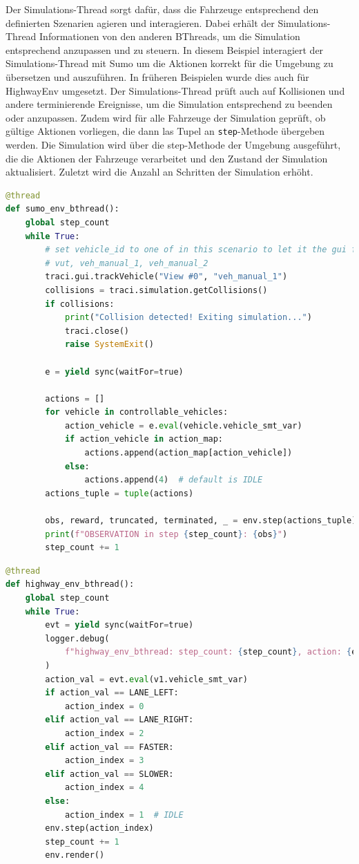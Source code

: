 Der Simulations-Thread sorgt dafür, dass die Fahrzeuge entsprechend den definierten Szenarien agieren und interagieren. Dabei erhält der Simulations-Thread Informationen von den anderen BThreads, um die Simulation entsprechend anzupassen und zu steuern.
In diesem Beispiel interagiert der Simulations-Thread mit Sumo um die Aktionen korrekt für die Umgebung zu übersetzen und auszuführen. In früheren Beispielen wurde dies auch für HighwayEnv umgesetzt.
Der Simulations-Thread prüft auch auf Kollisionen und andere terminierende Ereignisse, um die Simulation entsprechend zu beenden oder anzupassen. Zudem wird für alle Fahrzeuge der Simulation geprüft, ob gültige Aktionen vorliegen, die dann las Tupel an \texttt{step}-Methode übergeben werden.
Die Simulation wird über die step-Methode der Umgebung ausgeführt, die die Aktionen der Fahrzeuge verarbeitet und den Zustand der Simulation aktualisiert. Zuletzt wird die Anzahl an Schritten der Simulation erhöht.
\begin{lstlisting}[language=Python, caption=Simulations-Thread Beispiel SumoEnv]
@thread
def sumo_env_bthread():
    global step_count
    while True:
        # set vehicle_id to one of in this scenario to let it the gui follow that vehicle
        # vut, veh_manual_1, veh_manual_2
        traci.gui.trackVehicle("View #0", "veh_manual_1")
        collisions = traci.simulation.getCollisions()
        if collisions:
            print("Collision detected! Exiting simulation...")
            traci.close()
            raise SystemExit()

        e = yield sync(waitFor=true)

        actions = []
        for vehicle in controllable_vehicles:
            action_vehicle = e.eval(vehicle.vehicle_smt_var)
            if action_vehicle in action_map:
                actions.append(action_map[action_vehicle])
            else:
                actions.append(4)  # default is IDLE
        actions_tuple = tuple(actions)

        obs, reward, truncated, terminated, _ = env.step(actions_tuple)
        print(f"OBSERVATION in step {step_count}: {obs}")
        step_count += 1
\end{lstlisting}


\begin{lstlisting}[language=Python, caption=Simulations-Thread Beispiel HighwayEnv]
@thread
def highway_env_bthread():
    global step_count
    while True:
        evt = yield sync(waitFor=true)
        logger.debug(
            f"highway_env_bthread: step_count: {step_count}, action: {evt.eval(v1.vehicle_smt_var)}"
        )
        action_val = evt.eval(v1.vehicle_smt_var)
        if action_val == LANE_LEFT:
            action_index = 0
        elif action_val == LANE_RIGHT:
            action_index = 2
        elif action_val == FASTER:
            action_index = 3
        elif action_val == SLOWER:
            action_index = 4
        else:
            action_index = 1  # IDLE
        env.step(action_index)
        step_count += 1
        env.render()
\end{lstlisting}


